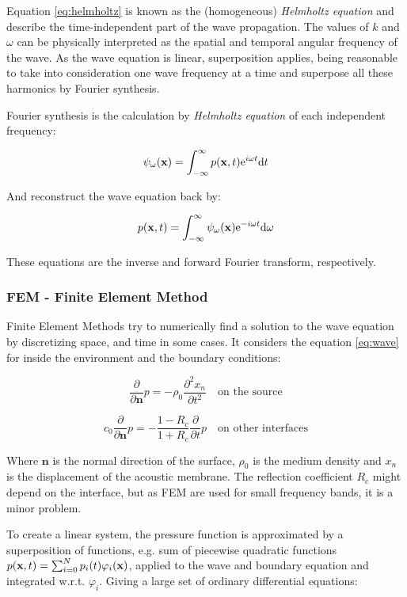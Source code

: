 Equation \ref{eq:helmholtz} is known as the (homogeneous) \textit{Helmholtz
equation} and describe the time-independent part of the wave propagation. The
values of $k$ and $\omega$ can be physically interpreted as the spatial and
temporal angular frequency of the wave. As the wave equation is 
linear, superposition applies, being reasonable to take into consideration one
wave frequency at a time and superpose all these harmonics by Fourier synthesis\cite{Lefebvre}.

Fourier synthesis is the calculation by \textit{Helmholtz
equation} of each independent frequency: 

\[ \psi_\omega(\mathrm{\mathbf{x}}) = \int_{-\infty}^\infty p(\mathrm{\mathbf{x}},t)\mathrm{e}^{i\omega t}\mathrm{d} t \]

And reconstruct the wave equation back by:

\[ p(\mathrm{\mathbf{x}},t) = \int_{-\infty}^\infty\psi_\omega(\mathrm{\mathbf{x}})\mathrm{e}^{-i\omega t}\mathrm{d}\omega \]

These equations are the inverse and forward Fourier transform, respectively.

\subsubsection{FEM - Finite Element Method}

Finite Element Methods try to numerically find a solution to the wave equation
by discretizing space, and time in some cases. It considers the equation
\ref{eq:wave} for inside the environment and the boundary conditions:

\[  \frac{\partial}{\partial \mathbf{n}}p= -\rho_0 \frac{\partial^2
x_n}{\partial t^2} \quad \text{on the source} \]

\[  c_0 \frac{\partial}{\partial \mathbf{n}}p= - \frac{1-R_c}{1+R_c}
\frac{\partial}{\partial t} p \quad \text{on other interfaces} \]

Where $\mathbf{n}$ is the normal direction of the surface, $\rho_0$ is the
medium density and $x_n$ is the displacement of the acoustic membrane. The
reflection coefficient $R_c$ might depend on the interface, but as FEM are used
for small frequency bands, it is a minor problem\cite{deines2006comparative}.

To create a linear system, the pressure function is approximated by a
superposition of functions, e.g. sum of piecewise quadratic functions \(
p(\mathrm{\mathbf{x}},t)= \sum_{i=0}^N p_i(t) \varphi_i(\mathrm{\mathbf{x}}) \), applied to the wave and boundary
equation and integrated w.r.t. $\varphi_i$. Giving a large set of ordinary
differential equations:

